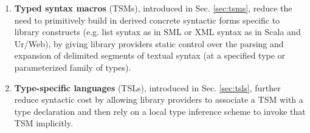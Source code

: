 \begin{enumerate}
\item \textbf{Typed syntax macros} (TSMs), introduced in Sec. \ref{sec:tsms}, reduce the need to primitively build in derived concrete syntactic forms specific to library constructs (e.g. list syntax as in SML or XML syntax as in Scala and Ur/Web), by giving library providers static control over the parsing and expansion of delimited segments of textual syntax (at a specified type or parameterized family of types). 
\item \textbf{Type-specific languages} (TSLs), introduced in Sec. \ref{sec:tsls}, further reduce syntactic cost by allowing library providers to associate a TSM with a type declaration and then rely on a local type inference scheme to invoke that TSM implicitly.
\end{enumerate} 
